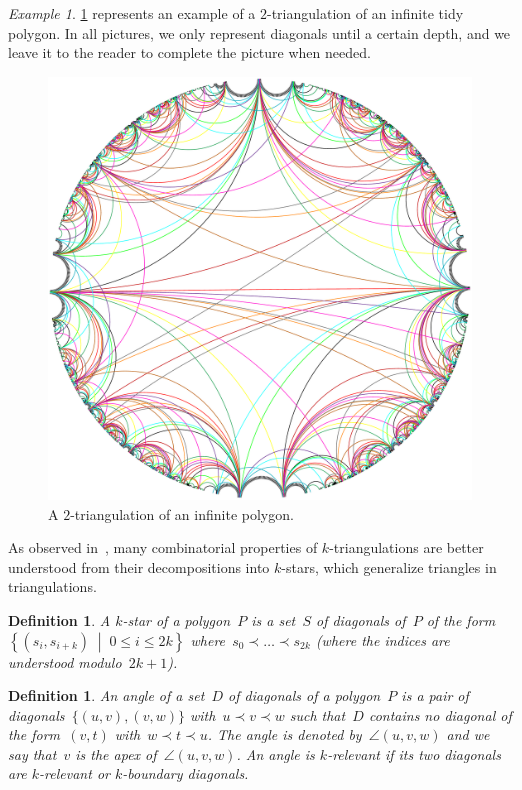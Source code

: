 \documentclass{amsart}
\newtheorem{definition}[theorem]{Definition}
\theoremstyle{remark}
\newtheorem{example}[theorem]{Example}
\newcommand{\darkblue}{\color{darkblue}} %
\newcommand{\defn}[1]{\textsl{\darkblue #1}} %
\newcommand{\set}[2]{\left\{ #1 \;\middle|\; #2 \right\}} %
\newcommand{\cl}{\prec}
\begin{document}
\begin{example}
\cref{fig:torusEdges} represents an example of a $2$-triangulation of an infinite tidy polygon.
In all pictures, we only represent diagonals until a certain depth, and we leave it to the reader to complete the picture when needed.

\begin{figure}[h]
	\capstart
	\centerline{\includegraphics[scale=.42]{torus/torusEdges}}
	\caption{A $2$-triangulation of an infinite polygon.}
	\label{fig:torusEdges}
\end{figure}
\end{example}

As observed in~\cite{PilaudSantos-multitriangulations}, many combinatorial properties of $k$-triangulations are better understood from their decompositions into $k$-stars, which generalize triangles in triangulations.

\begin{definition}
A \defn{$k$-star} of a polygon~$P$ is a set~$S$ of diagonals of~$P$ of the form~$\set{(s_i, s_{i+k})}{0 \le i \le 2k}$ where~$s_0 \cl \dots \cl s_{2k}$ (where the indices are understood modulo~$2k+1$).
\end{definition}

\begin{definition}
An \defn{angle} of a set~$D$ of diagonals of a polygon~$P$ is a pair of diagonals~$\{(u,v), (v,w)\}$ with~$u \cl v \cl w$ such that~$D$ contains no diagonal of the form~$(v,t)$ with~$w \cl t \cl u$. The angle is denoted by~$\angle(u,v,w)$ and we say that~$v$ is the \defn{apex} of~$\angle(u,v,w)$. An angle is \defn{$k$-relevant} if its two diagonals are $k$-relevant or $k$-boundary diagonals. %
\end{definition}
\end{document}
